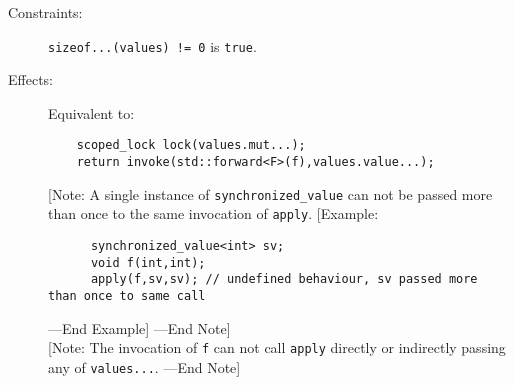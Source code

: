 \begin{description}
\item[Constraints:]
\texttt{sizeof...(values)\ !=\ 0} is \texttt{true}.
\item[Effects:]
Equivalent to:

\begin{verbatim}
    scoped_lock lock(values.mut...);
    return invoke(std::forward<F>(f),values.value...);
\end{verbatim}

{[}Note: A single instance of \texttt{synchronized\_value} can not be
passed more than once to the same invocation of \texttt{apply}.
{[}Example:

\begin{verbatim}
      synchronized_value<int> sv;
      void f(int,int);
      apply(f,sv,sv); // undefined behaviour, sv passed more than once to same call
\end{verbatim}

---End Example{]} ---End Note{]}\\
{[}Note: The invocation of \texttt{f} can not call \texttt{apply}
directly or indirectly passing any of \texttt{values...}. ---End Note{]}
\end{description}

